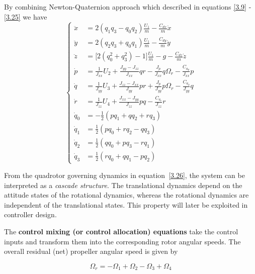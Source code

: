 \begin{small}

By combining Newton-Quaternion approach which described in equations \eqref{3.9} - \eqref{3.25} we have 
\begin{equation}
\left\{
\begin{aligned}
 \ddot{x} &= 2(q_1q_3 - q_0q_2)\tfrac{U_1}{m} - \tfrac{C_{dx}}{m}\dot{x} \\[-3pt]
\ddot{y} &= 2(q_2q_3 + q_0q_1)\tfrac{U_1}{m} - \tfrac{C_{dy}}{m}\dot{y} \\[-3pt]
\ddot{z} &= \big[2(q_0^2+q_3^2)-1\big]\tfrac{U_1}{m} - g - \tfrac{C_{dz}}{m}\dot{z} \\[-3pt]
\dot{p} &= \tfrac{1}{J_{xx}}U_2+\tfrac{J_{yy}-J_{zz}}{J_{xx}}qr-\tfrac{J_p}{J_{xx}}q\Omega_r-\tfrac{C_{a_p}}{J_{xx}}p \\[-3pt]
\dot{q} &= \tfrac{1}{J_{yy}}U_3+\tfrac{J_{zz}-J_{xx}}{J_{yy}}pr+\tfrac{J_p}{J_{yy}}p\Omega_r-\tfrac{C_{a_q}}{J_{yy}}q \\[-3pt]
\dot{r} &= \tfrac{1}{J_{zz}}U_4+\tfrac{J_{xx}-J_{yy}}{J_{zz}}pq-\tfrac{C_{a_r}}{J_{zz}}r \\[-3pt]
\dot{q}_0 &= -\tfrac{1}{2}(pq_1+qq_2+rq_3) \\[-3pt]
\dot{q}_1 &= \tfrac{1}{2}(pq_0+rq_2-qq_3) \\[-3pt]
\dot{q}_2 &= \tfrac{1}{2}(qq_0+pq_3-rq_1) \\[-3pt]
\dot{q}_3 &= \tfrac{1}{2}(rq_0+qq_1-pq_2) 
\end{aligned}
\right.
\label{3.26}
\end{equation}

From the quadrotor governing dynamics in equation~\eqref{3.26}, the system can be interpreted 
as a \textit{cascade structure}. The translational dynamics depend on the attitude states of 
the rotational dynamics, whereas the rotational dynamics are independent of the translational 
states. This property will later be exploited in controller design. 

The \textbf{control mixing (or control allocation) equations} take the control inputs and 
transform them into the corresponding rotor angular speeds. The overall residual (net) 
propeller angular speed is given by

\begin{equation}
\Omega_r = -\Omega_1 + \Omega_2 - \Omega_3 + \Omega_4
\label{3.27}
\end{equation}


\end{small}
